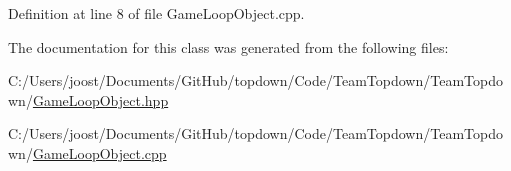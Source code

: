 Definition at line 8 of file Game\+Loop\+Object.\+cpp.



The documentation for this class was generated from the following files\+:\begin{DoxyCompactItemize}
\item 
C\+:/\+Users/joost/\+Documents/\+Git\+Hub/topdown/\+Code/\+Team\+Topdown/\+Team\+Topdown/\hyperlink{_game_loop_object_8hpp}{Game\+Loop\+Object.\+hpp}\item 
C\+:/\+Users/joost/\+Documents/\+Git\+Hub/topdown/\+Code/\+Team\+Topdown/\+Team\+Topdown/\hyperlink{_game_loop_object_8cpp}{Game\+Loop\+Object.\+cpp}\end{DoxyCompactItemize}
